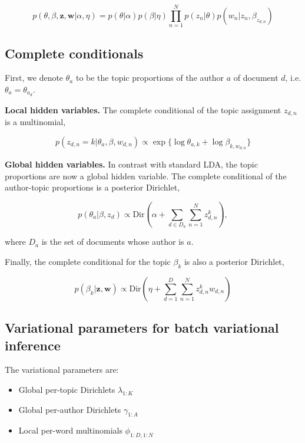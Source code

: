 \begin{equation}
p(\theta,\beta,\mathbf{z},\mathbf{w}|\alpha,\eta) = p(\theta|\alpha) p(\beta|\eta) \prod_{n=1}^{N}{p(z_n|\theta)p(w_n|z_n,\beta_{z_{d,n}})}
\end{equation}


\subsection{Complete conditionals}

First, we denote $\theta_a$ to be the topic proportions of the author $a$ of document $d$, i.e. $\theta_a = \theta_{a_d}$.

\textbf{Local hidden variables.} The complete conditional of the topic assignment $z_{d,n}$ is a multinomial,

\begin{equation}
p(z_{d,n} = k | \theta_a, \beta, w_{d,n}) \propto \exp \{ \log \theta_{a,k} + \log \beta_{k,w_{d,n}} \}
\end{equation}

\textbf{Global hidden variables.} In contrast with standard LDA, the topic proportions are now a global hidden variable.
The complete conditional of the author-topic proportions is a posterior Dirichlet,

\begin{equation}
p(\theta_a | \beta, z_{d}) \propto \text{Dir} ( \alpha + \sum_{d \in D_a}{\sum_{n=1}^{N}{z^k_{d,n}}}),
\end{equation}

\noindent where $D_a$ is the set of documents whose author is $a$.

Finally, the complete conditional for the topic $\beta_k$ is also a posterior Dirichlet,

\begin{equation}
p(\beta_k | \mathbf{z}, \mathbf{w}) \propto \text{Dir} ( \eta + \sum_{d=1}^{D}{\sum_{n=1}^{N}{z^k_{d,n}w_{d,n}}})
\end{equation}



\subsection{Variational parameters for batch variational inference}

The variational parameters are:
\begin{itemize}
	\item Global per-topic Dirichlets $\lambda_{1:K}$
	\item Global per-author Dirichlets $\gamma_{1:A}$
	\item Local per-word multinomials $\phi_{1:D,1:N}$
\end{itemize}


